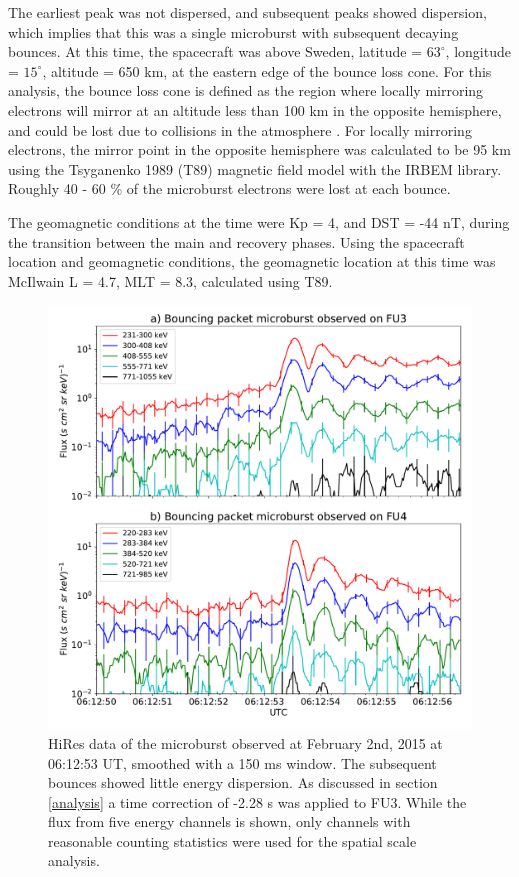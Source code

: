 \documentclass[draft,linenumbers]{agujournal}
\begin{document}
The earliest peak was not dispersed, and subsequent peaks showed dispersion, which implies that this was a single microburst with subsequent decaying bounces. At this time, the spacecraft was above Sweden, latitude = $63^{\circ}$, longitude = $15^{\circ}$, altitude = 650 km, at the eastern edge of the bounce loss cone. For this analysis, the bounce loss cone is defined as the region where locally mirroring electrons will mirror at an altitude less than 100 km in the opposite hemisphere, and could be lost due to collisions in the atmosphere \citep{Abel1998_1}. For locally mirroring electrons, the mirror point in the opposite hemisphere was calculated to be 95 km using the Tsyganenko 1989 (T89) magnetic field model \citep{Tsyganenko1989} with the IRBEM library. Roughly 40 - 60 \% of the microburst electrons were lost at each bounce. 

The geomagnetic conditions at the time were Kp = 4, and DST = -44 nT, during the transition between the main and recovery phases. Using the spacecraft location and geomagnetic conditions, the geomagnetic location at this time was McIlwain L = 4.7, MLT = 8.3, calculated using T89. 

\begin{figure}
\includegraphics[width=\textwidth]{hires_plot_log_8pt_smooth.pdf}
\caption{HiRes data of the microburst observed at February 2nd, 2015 at 06:12:53 UT, smoothed with a 150 ms window. The subsequent bounces showed little energy dispersion. As discussed in section \ref{analysis} a time correction of -2.28 s was applied to FU3. While the flux from five energy channels is shown, only channels with reasonable counting statistics were used for the spatial scale analysis.}
\label{hires_plot}
\end{figure}
\end{document}
